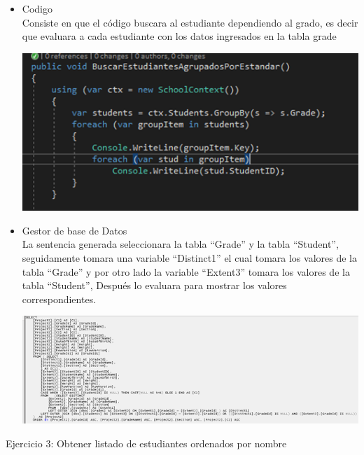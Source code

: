 \begin{itemize}
	\item Codigo
	\\Consiste en que el código buscara al estudiante dependiendo al grado, es decir que  evaluara a cada estudiante con los datos ingresados en la tabla grade
	\begin{center}
	\includegraphics[width=15cm]{./Imagenes/2a} 
	\end{center}
	
	\item Gestor de base de Datos
	\\La sentencia generada seleccionara la tabla “Grade” y la tabla “Student”, seguidamente tomara una variable “Distinct1” el cual tomara los valores de la tabla “Grade” y por otro lado la variable “Extent3” tomara los valores de la tabla “Student”, Después lo evaluara para mostrar los valores correspondientes.
	\\
\begin{center}
	\includegraphics[width=15cm]{./Imagenes/2b} 
	\end{center}
	
\end{itemize} 
\newpage

Ejercicio 3: Obtener listado de estudiantes ordenados por nombre

